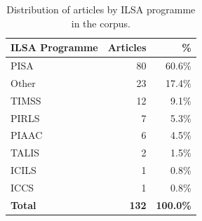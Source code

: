 \begin{table}[htbp]
  \centering
  \caption{Distribution of articles by ILSA programme in the corpus.}
  \label{tab:ilsa_programs}
  \begin{tabular}{lrr}
    \toprule
    ILSA Programme & Articles & \% \\
    \midrule
    PISA & 80 & 60.6\% \\
    Other & 23 & 17.4\% \\
    TIMSS & 12 & 9.1\% \\
    PIRLS & 7 & 5.3\% \\
    PIAAC & 6 & 4.5\% \\
    TALIS & 2 & 1.5\% \\
    ICILS & 1 & 0.8\% \\
    ICCS & 1 & 0.8\% \\
    \textbf{Total} & \textbf{132} & \textbf{100.0\%} \\
    \bottomrule
  \end{tabular}
\end{table}